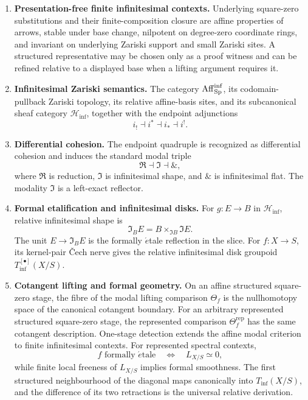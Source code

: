 \begin{theorem}
\begin{enumerate}[label=(\roman*)]
    \item \textbf{Presentation-free finite infinitesimal contexts.}
    Underlying square-zero substitutions and their finite-composition closure
    are affine properties of arrows, stable under base change, nilpotent on
    degree-zero coordinate rings, and invariant on underlying Zariski support
    and small Zariski sites. A structured representative may be chosen only as
    a proof witness and can be refined relative to a displayed base when a
    lifting argument requires it.

    \item \textbf{Infinitesimal Zariski semantics.}
    The category \(\operatorname{Aff}_{\operatorname{Sp}}^{\inf}\), its codomain-pullback Zariski topology,
    its relative affine-basis sites, and its subcanonical sheaf category
    \(\mathcal H_{\inf}\), together with the endpoint adjunctions
    \[
        i_!\dashv i^*\dashv i_*\dashv i^!.
    \]

    \item \textbf{Differential cohesion.}
    The endpoint quadruple is recognized as differential cohesion and induces
    the standard modal triple
    \[
        \Re\dashv\Im\dashv\&,
    \]
    where \(\Re\) is reduction, \(\Im\) is infinitesimal shape, and \(\&\)
    is infinitesimal flat. The modality \(\Im\) is a left-exact reflector.

    \item \textbf{Formal etalification and infinitesimal disks.}
    For \(g:E\to B\) in \(\mathcal H_{\inf}\), relative infinitesimal shape is
    \[
        \Im_BE=B\times_{\Im B}\Im E.
    \]
    The unit \(E\to\Im_BE\) is the formally \(\acute{e}\)tale reflection in
    the slice. For \(f:X\to S\), its kernel-pair \v{C}ech nerve gives the
    relative infinitesimal disk groupoid \(T_{\inf}^{[\bullet]}(X/S)\).

    \item \textbf{Cotangent lifting and formal geometry.}
    On an affine structured square-zero stage, the fibre of the modal lifting
    comparison \(\Theta_f\) is the nullhomotopy space of the canonical
    cotangent boundary. For an arbitrary represented structured square-zero
    stage, the represented comparison
    \(\Theta_f^{\mathrm{rep}}\) has the same cotangent description.
    One-stage detection extends the affine modal criterion to finite
    infinitesimal contexts. For represented spectral contexts,
    \[
        f\text{ formally }\acute{e}\text{tale}
        \quad\Longleftrightarrow\quad
        L_{X/S}\simeq0,
    \]
    while finite local freeness of \(L_{X/S}\) implies formal smoothness.
    The first structured neighbourhood of the diagonal maps canonically into
    \(T_{\inf}(X/S)\), and the difference of its two retractions is the
    universal relative derivation.


\end{enumerate}
\end{theorem}
